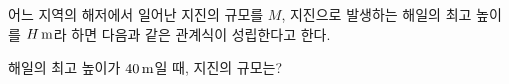 어느 지역의 해저에서 일어난 지진의 규모를 $M$, 지진으로 발생하는 해일의 최고 높이를 $H\mkern3mu \mathrm{m}$라 하면 다음과 같은 관계식이 성립한다고 한다.\par\smallskip{}\par\smallskip\noindent 해일의 최고 높이가 $40\mkern3mu \mathrm{m}$일 때, 지진의 규모는? 
